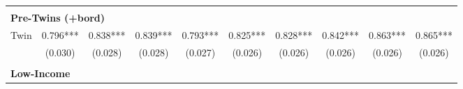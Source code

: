 \begin{landscape}
\begin{table}[htpb!]
\begin{center}
\begin{tabular}{lccccccccc}
\begin{footnotesize}\end{footnotesize}&\begin{footnotesize}\end{footnotesize}&\begin{footnotesize}\end{footnotesize}&\begin{footnotesize}\end{footnotesize}&\begin{footnotesize}\end{footnotesize}&\begin{footnotesize}\end{footnotesize}&\begin{footnotesize}\end{footnotesize}&\begin{footnotesize}\end{footnotesize}&\begin{footnotesize}\end{footnotesize}&\begin{footnotesize}\end{footnotesize}\\\multicolumn{10}{l}{\textbf{Pre-Twins (+bord)}}\\ 
Twin&0.796***&0.838***&0.839***&0.793***&0.825***&0.828***&0.842***&0.863***&0.865***\\
&(0.030)&(0.028)&(0.028)&(0.027)&(0.026)&(0.026)&(0.026)&(0.026)&(0.026)\\
\begin{footnotesize}\end{footnotesize}&\begin{footnotesize}\end{footnotesize}&\begin{footnotesize}\end{footnotesize}&\begin{footnotesize}\end{footnotesize}&\begin{footnotesize}\end{footnotesize}&\begin{footnotesize}\end{footnotesize}&\begin{footnotesize}\end{footnotesize}&\begin{footnotesize}\end{footnotesize}&\begin{footnotesize}\end{footnotesize}&\begin{footnotesize}\end{footnotesize}\\\multicolumn{10}{l}{\textbf{Low-Income}}\\ 

\end{tabular}
\end{center}
\end{table}
\end{landscape}
